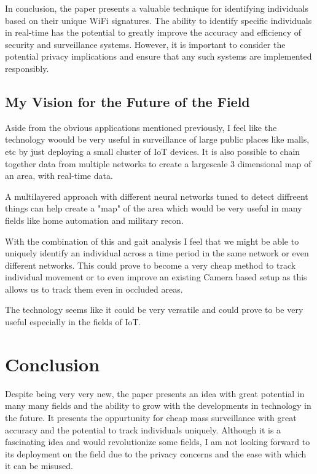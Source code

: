 \documentclass{article}
\begin{document}
In conclusion, the paper presents a valuable technique for identifying individuals based on their unique WiFi signatures. The ability to identify specific individuals in real-time has the potential to greatly improve the accuracy and efficiency of security and surveillance systems. However, it is important to consider the potential privacy implications and ensure that any such systems are implemented responsibly.


\subsection{My Vision for the Future of the Field}
Aside from the obvious applications mentioned previously, I feel like the technology woould be very useful in surveillance of large public places like malls, etc by just deploying a small cluster of IoT devices.
It is also possible to chain together data from multiple networks to create a largescale 3 dimensional map of an area, with real-time data.

A multilayered approach with different neural networks tuned to detect diffreent things can help create a "map" of the area which would be very useful in many fields like home automation and military recon. 

With the combination of this and gait analysis I feel that we might be able to uniquely identify an individual across a time period in the same network or even different networks. 
This could prove to become a very cheap method to track individual movement or to even improve an existing Camera based setup as this allows us to track them even in occluded areas.

The technology seems like it could be very versatile and could prove to be very useful especially in the fields of IoT. 

\section{Conclusion} %
\label{sec:Conclusion}

Despite being very very new, the paper presents an idea with great potential in many many fields and the ability to grow with the developments in technology in the future. 
It presents the oppurtunity for cheap mass surveillance with great accuracy and the potential to track individuals uniquely. 
Although it is a fascinating idea and would revolutionize some fields, I am not looking forward to its deployment on the field due to the privacy concerns and the ease with which it can be misused.
\end{document}
